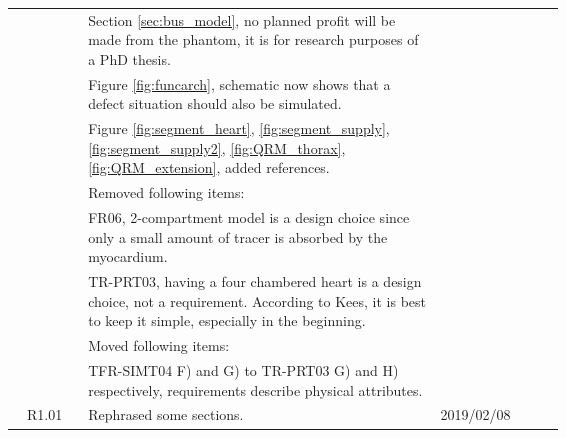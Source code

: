 {\begin{longtable}{|c|p{0.64\linewidth}|l|}
		 	& \hspace{0.5cm} \textbullet Section \ref{sec:bus_model}, no planned profit will be made from the phantom, it is for research purposes of a PhD thesis. & \\
		 	& \hspace{0.5cm} \textbullet Figure \ref{fig:funcarch}, schematic now shows that a defect situation should also be simulated. & \\
		 	& \hspace{0.5cm} \textbullet Figure \ref{fig:segment_heart}, \ref{fig:segment_supply}, \ref{fig:segment_supply2}, \ref{fig:QRM_thorax}, \ref{fig:QRM_extension}, added references. & \\
		 	& Removed following items: & \\
		 	& \hspace{0.5cm} \textbullet FR06, 2-compartment model is a design choice since only a small amount of tracer is absorbed by the myocardium. & \\
		 	& \hspace{0.5cm} \textbullet TR-PRT03, having a four chambered heart is a design choice, not a requirement. According to Kees, it is best to keep it simple, especially in the beginning. & \\
		 	& Moved following items: & \\
		 	& TFR-SIMT04 F) and G) to TR-PRT03 G) and H) respectively, requirements describe physical attributes. & \\
		 	R1.01 & Rephrased some sections. & 2019/02/08 \\
		\hline
\end{longtable}
}


